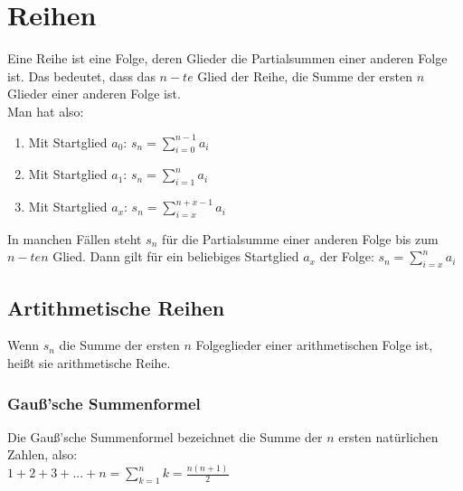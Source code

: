 \chapter{Reihen}

\begin{Definition}
Eine Reihe ist eine Folge, deren Glieder die Partialsummen einer anderen Folge ist. Das bedeutet, dass das $n-te$ Glied der Reihe, die Summe der ersten $n$ Glieder einer anderen Folge ist. \\
Man hat also:

\begin{enumerate}
\item Mit Startglied $a_{0}$: $s_{n}=\sum\limits_{i=0}^{n-1}a_{i}$
\item Mit Startglied $a_{1}$: $s_{n}=\sum\limits_{i=1}^{n}a_{i}$
\item Mit Startglied $a_{x}$: $s_{n}=\sum\limits_{i=x}^{n+x-1}a_{i}$
\end{enumerate}

\end{Definition}

\begin{Bemerkung}
In manchen Fällen steht $s_{n}$ für die Partialsumme einer anderen Folge bis zum $n-ten$ Glied.
Dann gilt für ein beliebiges Startglied $a_{x}$ der Folge: $s_{n}=\sum\limits_{i=x}^{n}a_{i}$
\end{Bemerkung}

		\section{Artithmetische Reihen}

\begin{Definition}
Wenn $s_{n}$ die Summe der ersten $n$ Folgeglieder einer arithmetischen Folge ist, heißt sie arithmetische Reihe.
\end{Definition}

	\subsection{Gauß'sche Summenformel}

Die Gauß'sche Summenformel bezeichnet die Summe der $n$ ersten natürlichen Zahlen, also:\\
$1+2+3+...+n=\sum\limits_{k=1}^{n}k=\frac{n(n+1)}{2}$\\\\

